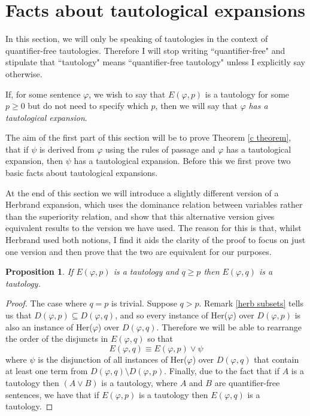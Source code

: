 \documentclass[a4paper,12pt]{report}
\newtheorem{prop}[lem]{Proposition}
\theoremstyle{definition}
\begin{document}
\section{Facts about tautological expansions}
\label{sec:bc}

In this section, we will only be speaking of tautologies in the context of quantifier-free tautologies. Therefore I will stop writing ``quantifier-free" and stipulate that ``tautology" means ``quantifier-free tautology" unless I explicitly say otherwise.

If, for some sentence $\varphi$, we wish to say that $E(\varphi, p)$ is a tautology for some $p \ge 0$ but do not need to specify which $p$, then we will say that $\varphi$ \emph{has a tautological expansion}.

The aim of the first part of this section will be to prove Theorem \ref{c theorem}, that if $\psi$ is derived from $\varphi$ using the rules of passage and $\varphi$ has a tautological expansion, then $\psi$ has a tautological expansion. Before this we first prove two basic facts about tautological expansions.

At the end of this section we will introduce a slightly different version of a Herbrand expansion, which uses the dominance relation between variables rather than the superiority relation, and show that this alternative version gives equivalent results to the version we have used. The reason for this is that, whilst Herbrand used both notions, I find it aids the clarity of the proof to focus on just one version and then prove that the two are equivalent for our purposes.

\begin{prop}
\label{upwardsbc}
If $E(\varphi, p)$ is a tautology and $q \ge p$ then $E(\varphi, q)$ is a tautology.
\end{prop}
\begin{proof}
The case where $q = p$ is trivial. Suppose $q>p$. Remark \ref{herb subsets} tells us that $D(\varphi, p) \subseteq D(\varphi, q)$, and so every instance of Her($\varphi$) over $D(\varphi, p)$ is also an instance of Her($\varphi$) over $D(\varphi, q)$. Therefore we will be able to rearrange the order of the disjuncts in $E(\varphi, q)$ so that
$$
E(\varphi, q) \equiv E(\varphi, p) \lor \psi
$$
where $\psi$ is the disjunction of all instances of Her($\varphi$) over $D(\varphi, q)$ that contain at least one term from $D(\varphi, q) \setminus D(\varphi, p)$. Finally, due to the fact that if $A$ is a tautology then $( A \lor B )$ is a tautology, where $A$ and $B$ are quantifier-free sentences, we have that if $E(\varphi, p)$ is a tautology then $E(\varphi, q)$ is a tautology.
\end{proof}
\end{document}
